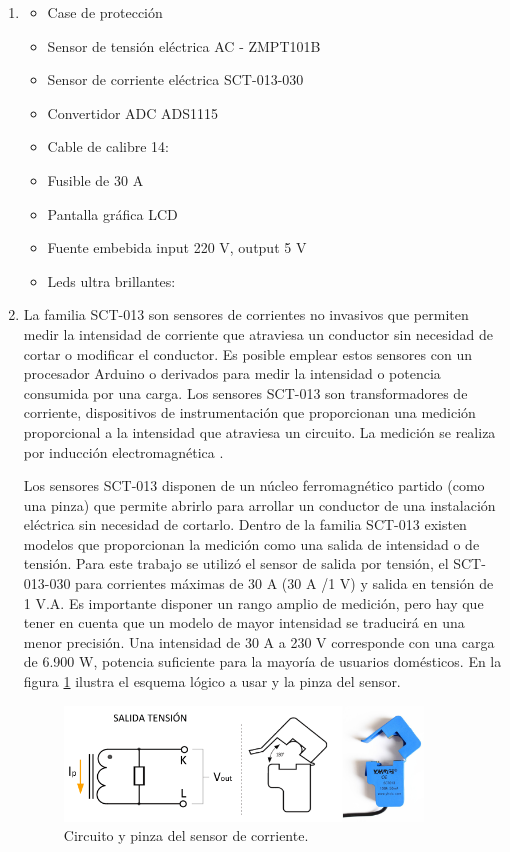\begin{enumerate}
\item {}
\begin{itemize}
\item Case de protección
\item Sensor de tensión eléctrica AC - ZMPT101B
\item Sensor de corriente eléctrica SCT-013-030
\item Convertidor ADC ADS1115
\item Cable de calibre 14:
\item Fusible de 30 A
\item Pantalla gráfica LCD
\item Fuente embebida input 220 V, output 5 V
\item Leds ultra brillantes:
\end{itemize}

\item {}

La familia SCT-013 son sensores de corrientes no invasivos que permiten medir la intensidad de corriente que atraviesa un conductor sin necesidad de cortar o modificar el conductor. Es posible emplear estos sensores con un procesador Arduino o derivados para medir la intensidad o potencia consumida por una carga. Los sensores SCT-013 son transformadores de corriente, dispositivos de instrumentación que proporcionan una medición proporcional a la intensidad que atraviesa un circuito. La medición se realiza por inducción electromagnética \citep{WEBSITE:9}.

Los sensores SCT-013 disponen de un núcleo ferromagnético partido (como una  pinza) que permite abrirlo para arrollar un conductor de una instalación eléctrica sin necesidad de cortarlo. Dentro de la familia SCT-013 existen modelos que proporcionan la medición como una salida de intensidad o de tensión. Para este trabajo se utilizó el sensor de salida por tensión, el SCT-013-030 para corrientes máximas de 30 A (30 A /1 V) y salida en tensión de 1 V.A. Es importante disponer un rango amplio de medición, pero hay que tener en cuenta que un modelo de mayor intensidad se traducirá en una menor precisión. Una intensidad de 30 A a 230 V corresponde con una carga de 6.900 W, potencia suficiente para la mayoría de usuarios domésticos. En la figura \ref{fig:consumo1} ilustra el esquema lógico a usar y la pinza del sensor.

\begin{figure}[htpb]
\centering 
\includegraphics[width=0.9\textwidth]{./Figures/consumo1.png}
\caption{Circuito y pinza del sensor de corriente. }
\label{fig:consumo1}
\end{figure}


\end{enumerate}
